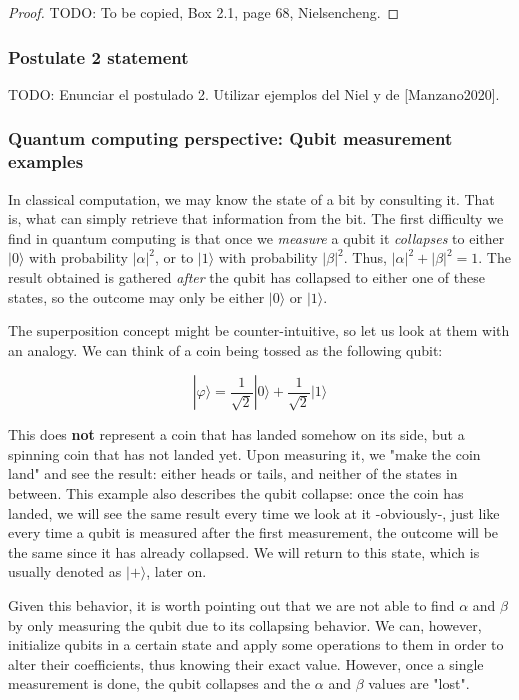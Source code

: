 \documentclass{article}
\begin{document}
	\begin{proof}
		TODO: To be copied, Box 2.1, page 68, Nielsencheng.
	\end{proof}
	
	
	\subsubsection{Postulate 2 statement}
	
	
	TODO: Enunciar el postulado 2. Utilizar ejemplos del Niel y de [Manzano2020].
	
	
	\subsubsection{Quantum computing perspective: Qubit measurement examples}
	
	
	In classical computation, we may know the state of a bit by consulting it. That is, what can simply retrieve that information from the bit. The first difficulty we find in quantum computing is that once we \emph{measure} a qubit it \emph{collapses} to either $|0\rangle$ with probability $|\alpha|^2$, or to $|1\rangle$ with probability $|\beta|^2$. Thus, $|\alpha|^2 + |\beta|^2 = 1$. The result obtained is gathered \emph{after} the qubit has collapsed to either one of these states, so the outcome may only be either $|0\rangle$ or $|1\rangle$.
	
	The superposition concept might be counter-intuitive, so let us look at them with an analogy. We can think of a coin being tossed as the following qubit:
	
	$$ |\varphi\rangle = \frac{1}{\sqrt{2}} |0\rangle + \frac{1}{\sqrt{2}} |1\rangle $$
	
	This does \textbf{not} represent a coin that has landed somehow on its side, but a spinning coin that has not landed yet. Upon measuring it, we "make the coin land" and see the result: either heads or tails, and neither of the states in between. This example also describes the qubit collapse: once the coin has landed, we will see the same result every time we look at it -obviously-, just like every time a qubit is measured after the first measurement, the outcome will be the same since it has already collapsed. We will return to this state, which is usually denoted as $|+\rangle$, later on.
	
	Given this behavior, it is worth pointing out that we are not able to find $\alpha$ and $\beta$ by only measuring the qubit due to its collapsing behavior. We can, however, initialize qubits in a certain state and apply some operations to them in order to alter their coefficients, thus knowing their exact value. However, once a single measurement is done, the qubit collapses and the $\alpha$ and $\beta$ values are "lost".
	
\end{document}
